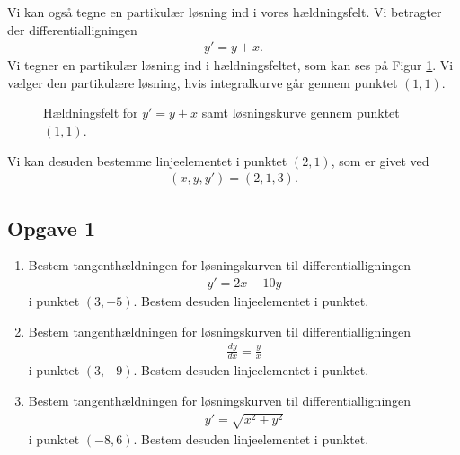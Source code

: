 \begin{exa}
	Vi kan også tegne en partikulær løsning ind i vores hældningsfelt. 
	Vi betragter der differentialligningen 
	\begin{align*}
		y' = y + x.
	\end{align*}
	Vi tegner en partikulær løsning ind i hældningsfeltet, som kan ses på Figur \ref{fig:hel2}. Vi vælger den partikulære løsning, hvis integralkurve går gennem punktet $(1,1)$.
	\begin{figure}[H]
	\centering
	\caption{Hældningsfelt for $y' = y + x$ samt løsningskurve gennem punktet $(1,1)$.}
	\label{fig:hel2}
	\end{figure}
	Vi kan desuden bestemme linjeelementet i punktet $(2,1)$, som er givet ved
	\begin{align*}	
		(x,y,y') = (2,1,3).
	\end{align*}
\end{exa}

\subsection*{Opgave 1}
\begin{enumerate}[label=\roman*)]
	\item Bestem tangenthældningen for løsningskurven til differentialligningen
	\begin{align*}
		y' = 2x - 10y
	\end{align*}
	i punktet $(3,-5)$. Bestem desuden linjeelementet i punktet.
	\item Bestem tangenthældningen for løsningskurven til differentialligningen
	\begin{align*}
		\frac{d y}{d x} = \frac{y}{x}
	\end{align*}
	i punktet $(3,-9)$. Bestem desuden linjeelementet i punktet.
	\item Bestem tangenthældningen for løsningskurven til differentialligningen 
	\begin{align*}
		y' = \sqrt{x^2 + y^2} 
	\end{align*}
	i punktet $(-8,6)$. Bestem desuden linjeelementet i punktet.
\end{enumerate}

